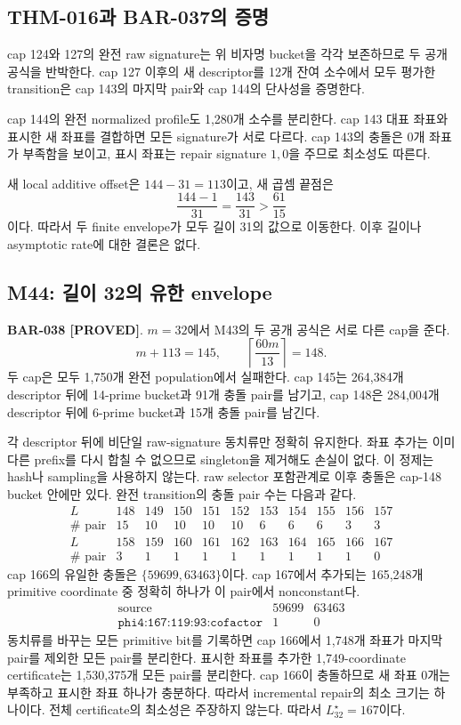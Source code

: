 \documentclass[11pt]{article}
\newcommand{\claimstatus}[2]{\textbf{#1 [#2]}}
\begin{document}
\subsection{THM-016과 BAR-037의 증명}

cap 124와 127의 완전 raw signature는 위 비자명 bucket을 각각
보존하므로 두 공개 공식을 반박한다. cap 127 이후의 새 descriptor를
12개 잔여 소수에서 모두 평가한 transition은 cap 143의 마지막
pair와 cap 144의 단사성을 증명한다.

cap 144의 완전 normalized profile도 1,280개 소수를 분리한다.
cap 143 대표 좌표와 표시한 새 좌표를 결합하면 모든 signature가 서로
다르다. cap 143의 충돌은 0개 좌표가 부족함을 보이고, 표시 좌표는
repair signature \(1,0\)을 주므로 최소성도 따른다.

새 local additive offset은 \(144-31=113\)이고, 새 곱셈 끝점은
\[
\frac{144-1}{31}=\frac{143}{31}>\frac{61}{15}
\]
이다. 따라서 두 finite envelope가 모두 길이 31의 값으로 이동한다.
이후 길이나 asymptotic rate에 대한 결론은 없다.

\subsection{M44: 길이 32의 유한 envelope}

\claimstatus{BAR-038}{PROVED}.
\(m=32\)에서 M43의 두 공개 공식은 서로 다른 cap을 준다.
\[
m+113=145,\qquad
\left\lceil\frac{60m}{13}\right\rceil=148.
\]
두 cap은 모두 1,750개 완전 population에서 실패한다. cap 145는
264,384개 descriptor 뒤에 14-prime bucket과 91개 충돌 pair를
남기고, cap 148은 284,004개 descriptor 뒤에 6-prime bucket과
15개 충돌 pair를 남긴다.

각 descriptor 뒤에 비단일 raw-signature 동치류만 정확히 유지한다.
좌표 추가는 이미 다른 prefix를 다시 합칠 수 없으므로 singleton을
제거해도 손실이 없다. 이 정제는 hash나 sampling을 사용하지 않는다.
raw selector 포함관계로 이후 충돌은 cap-148 bucket 안에만 있다.
완전 transition의 충돌 pair 수는 다음과 같다.
\[
\begin{array}{c|rrrrrrrrrr}
L&148&149&150&151&152&153&154&155&156&157\\
\hline
\#\text{ pair}&15&10&10&10&10&6&6&6&3&3
\end{array}
\]
\[
\begin{array}{c|rrrrrrrrrr}
L&158&159&160&161&162&163&164&165&166&167\\
\hline
\#\text{ pair}&3&1&1&1&1&1&1&1&1&0
\end{array}
\]
cap 166의 유일한 충돌은 \(\{59699,63463\}\)이다. cap 167에서
추가되는 165,248개 primitive coordinate 중 정확히 하나가 이
pair에서 nonconstant다.
\[
\begin{array}{c|rr}
\text{source}&59699&63463\\
\hline
\texttt{phi4:167:119:93:cofactor}&1&0
\end{array}
\]
동치류를 바꾸는 모든 primitive bit를 기록하면 cap 166에서
1,748개 좌표가 마지막 pair를 제외한 모든 pair를 분리한다. 표시한
좌표를 추가한 1,749-coordinate certificate는 1,530,375개 모든
pair를 분리한다. cap 166이 충돌하므로 새 좌표 0개는 부족하고 표시한
좌표 하나가 충분하다. 따라서 incremental repair의 최소 크기는
하나이다. 전체 certificate의 최소성은 주장하지 않는다. 따라서
\(L_{32}^{\star}=167\)이다.
\end{document}
